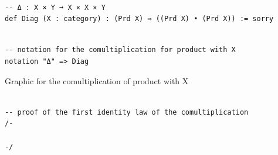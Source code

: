 \documentclass{book}
\newcounter{lcounter}
\begin{document}
\begin{center}
\begin{tcolorbox}[width=5in,colback={white},title={\begin{center}\texttt{Lean \thelcounter} \addtocounter{lcounter}{1}  \end{center}},colbacktitle=Blue,coltitle=black]
\begin{verbatim}

-- Δ : X × Y ➞ X × X × Y
def Diag (X : category) : (Prd X) ⇨ ((Prd X) • (Prd X)) := sorry

\end{verbatim}%
\end{tcolorbox}
\end{center}


\begin{center}
\begin{tcolorbox}[width=5in,colback={white},title={\begin{center}\texttt{Lean \thelcounter} \addtocounter{lcounter}{1}  \end{center}},colbacktitle=Blue,coltitle=black]
\begin{verbatim}

-- notation for the comultiplication for product with X
notation "Δ" => Diag

\end{verbatim}%
\end{tcolorbox}
\end{center}



\begin{center}
\begin{tcolorbox}[width=5in,colback={white},title={\begin{center}\texttt{Graphic} \addtocounter{lcounter}{1}  \end{center}},colbacktitle=Yellow,coltitle=black]

Graphic for the comultiplication of product with X

\end{tcolorbox}
\end{center}


\begin{center}
\begin{tcolorbox}[width=5in,colback={white},title={\begin{center}\texttt{Lean \thelcounter} \addtocounter{lcounter}{1}  \end{center}},colbacktitle=Blue,coltitle=black]
\begin{verbatim}

-- proof of the first identity law of the comultiplication
/-

-/

\end{verbatim}%
\end{tcolorbox}
\end{center}
\end{document}
